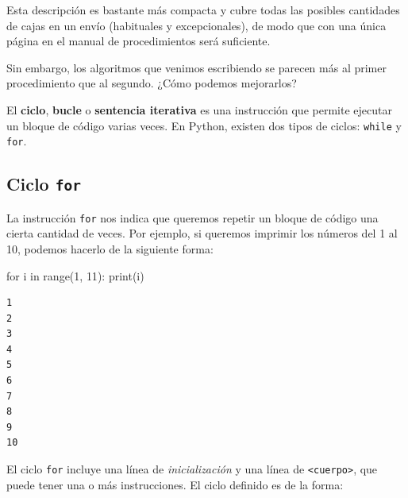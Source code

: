 \documentclass[
  letterpaper,
  DIV=11,
  numbers=noendperiod]{scrreprt}
\newenvironment{Shaded}{\begin{snugshade}}{\end{snugshade}}
\newcommand{\BuiltInTok}[1]{\textcolor[rgb]{0.00,0.23,0.31}{#1}}
\newcommand{\ControlFlowTok}[1]{\textcolor[rgb]{0.00,0.23,0.31}{#1}}
\newcommand{\DecValTok}[1]{\textcolor[rgb]{0.68,0.00,0.00}{#1}}
\newcommand{\KeywordTok}[1]{\textcolor[rgb]{0.00,0.23,0.31}{#1}}
\newcommand{\NormalTok}[1]{\textcolor[rgb]{0.00,0.23,0.31}{#1}}
\begin{document}
Esta descripción es bastante más compacta y cubre todas las posibles
cantidades de cajas en un envío (habituales y excepcionales), de modo
que con una única página en el manual de procedimientos será suficiente.

Sin embargo, los algoritmos que venimos escribiendo se parecen más al
primer procedimiento que al segundo. ¿Cómo podemos mejorarlos?

\begin{tcolorbox}[enhanced jigsaw, colframe=quarto-callout-note-color-frame, opacityback=0, opacitybacktitle=0.6, bottomrule=.15mm, toprule=.15mm, coltitle=black, breakable, colback=white, leftrule=.75mm, titlerule=0mm, bottomtitle=1mm, toptitle=1mm, rightrule=.15mm, title=\textcolor{quarto-callout-note-color}{\faInfo}\hspace{0.5em}{Ciclos}, arc=.35mm, left=2mm, colbacktitle=quarto-callout-note-color!10!white]

El \textbf{ciclo}, \textbf{bucle} o \textbf{sentencia iterativa} es una
instrucción que permite ejecutar un bloque de código varias veces. En
Python, existen dos tipos de ciclos: \texttt{while} y \texttt{for}.

\end{tcolorbox}

\hypertarget{ciclo-for}{%
\subsection{\texorpdfstring{Ciclo
\texttt{for}}{Ciclo for}}\label{ciclo-for}}

La instrucción \texttt{for} nos indica que queremos repetir un bloque de
código una cierta cantidad de veces. Por ejemplo, si queremos imprimir
los números del 1 al 10, podemos hacerlo de la siguiente forma:

\begin{Shaded}
\begin{Highlighting}[]
\ControlFlowTok{for}\NormalTok{ i }\KeywordTok{in} \BuiltInTok{range}\NormalTok{(}\DecValTok{1}\NormalTok{, }\DecValTok{11}\NormalTok{):}
    \BuiltInTok{print}\NormalTok{(i)}
\end{Highlighting}
\end{Shaded}

\begin{verbatim}
1
2
3
4
5
6
7
8
9
10
\end{verbatim}

El ciclo \texttt{for} incluye una línea de \emph{inicialización} y una
línea de \texttt{\textless{}cuerpo\textgreater{}}, que puede tener una o
más instrucciones. El ciclo definido es de la forma:
\end{document}
